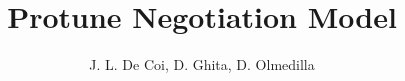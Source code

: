 \documentclass{article}
\begin{document}
\title{Protune Negotiation Model}
\author{J. L. De Coi, D. Ghita, D. Olmedilla}
\maketitle

\begin{comment}
\begin{description}
\item[Definition (List)] A list of elements $l$ is
  \begin{itemize}
	\item either the empty list
	\item or an element followed by a list
  \end{itemize}
\end{description}

Let $l$ be a non-empty list, therefore it is composed of an element $e$ and a (sub)list $l'$. $e$ (resp. $l'$) is called \textit{head} (resp. \textit{tail}) of $l$.

We will write the empty list as $[]$ and a non-empty list as $[head, tail]$.


\end{comment}
\end{document}
